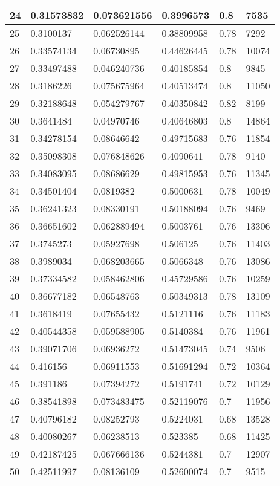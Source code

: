 \begin{longtable}{|l|l|l|l|l|l|}
24 & 0.31573832 & 0.073621556 & 0.3996573 & 0.8 & 7535 \\ \hline 
25 & 0.3100137 & 0.062526144 & 0.38809958 & 0.78 & 7292 \\ \hline 
26 & 0.33574134 & 0.06730895 & 0.44626445 & 0.78 & 10074 \\ \hline 
27 & 0.33497488 & 0.046240736 & 0.40185854 & 0.8 & 9845 \\ \hline 
28 & 0.3186226 & 0.075675964 & 0.40513474 & 0.8 & 11050 \\ \hline 
29 & 0.32188648 & 0.054279767 & 0.40350842 & 0.82 & 8199 \\ \hline 
30 & 0.3641484 & 0.04970746 & 0.40646803 & 0.8 & 14864 \\ \hline 
31 & 0.34278154 & 0.08646642 & 0.49715683 & 0.76 & 11854 \\ \hline 
32 & 0.35098308 & 0.076848626 & 0.4090641 & 0.78 & 9140 \\ \hline 
33 & 0.34083095 & 0.08686629 & 0.49815953 & 0.76 & 11345 \\ \hline 
34 & 0.34501404 & 0.0819382 & 0.5000631 & 0.78 & 10049 \\ \hline 
35 & 0.36241323 & 0.08330191 & 0.50188094 & 0.76 & 9469 \\ \hline 
36 & 0.36651602 & 0.062889494 & 0.5003761 & 0.76 & 13306 \\ \hline 
37 & 0.3745273 & 0.05927698 & 0.506125 & 0.76 & 11403 \\ \hline 
38 & 0.3989034 & 0.068203665 & 0.5066348 & 0.76 & 13086 \\ \hline 
39 & 0.37334582 & 0.058462806 & 0.45729586 & 0.76 & 10259 \\ \hline 
40 & 0.36677182 & 0.06548763 & 0.50349313 & 0.78 & 13109 \\ \hline 
41 & 0.3618419 & 0.07655432 & 0.5121116 & 0.76 & 11183 \\ \hline 
42 & 0.40544358 & 0.059588905 & 0.5140384 & 0.76 & 11961 \\ \hline 
43 & 0.39071706 & 0.06936272 & 0.51473045 & 0.74 & 9506 \\ \hline 
44 & 0.416156 & 0.06911553 & 0.51691294 & 0.72 & 10364 \\ \hline 
45 & 0.391186 & 0.07394272 & 0.5191741 & 0.72 & 10129 \\ \hline 
46 & 0.38541898 & 0.073483475 & 0.52119076 & 0.7 & 11956 \\ \hline 
47 & 0.40796182 & 0.08252793 & 0.5224031 & 0.68 & 13528 \\ \hline 
48 & 0.40080267 & 0.06238513 & 0.523385 & 0.68 & 11425 \\ \hline 
49 & 0.42187425 & 0.067666136 & 0.5244381 & 0.7 & 12907 \\ \hline 
50 & 0.42511997 & 0.08136109 & 0.52600074 & 0.7 & 9515 \\ \hline 
\end{longtable}